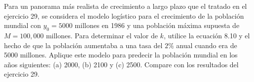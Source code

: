 \item Para un panorama más realista de crecimiento a largo plazo que el tratado en el ejercicio 29, se considera el modelo logístico para el crecimiento de la población mundial con $y_0 = 5000$ millones en 1986 y una población máxima supuesta de $M = 100,000$ millones. Para determinar el valor de $k$, utilice la ecuación 8.10 y el hecho de que la población aumentaba a una tasa del $2\%$ anual cuando era de 5000 millones. Aplique este modelo para predecir la población mundial en los años siguientes: (a) 2000, (b) 2100 y (c) 2500. Compare con los resultados del ejercicio 29.
